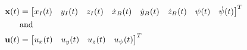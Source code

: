 \documentclass[../main.tex]{subfiles}
\begin{document}
\begin{equation*}
	\begin{aligned}
		\mathbf{x}(t) &= \begin{bmatrix} x_I(t) & y_I(t) & z_I(t) & \dot{x}_B(t) &
		\dot{y}_B(t) & \dot{z}_B(t) & \psi(t) & \dot{\psi}(t) \end{bmatrix}^T\\
			&\text{and}\\
		\mathbf{u}(t) &= \begin{bmatrix} u_x(t) & u_y(t) & u_z(t) & u_{\psi}(t) \end{bmatrix}^T
	\end{aligned}
\end{equation*}
\end{document}
